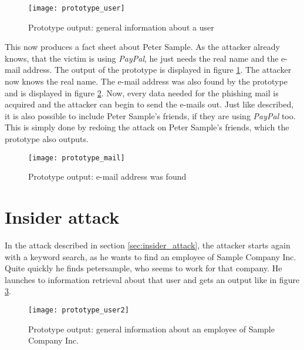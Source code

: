 \begin{figure}[htb]
  \begin{center}
    \texttt{[image: prototype\_user]}
    \caption{Prototype output: general information about a user}
    \label{fig:prototype_user}
  \end{center}
\end{figure}

This now produces a fact sheet about Peter Sample. As the attacker already
knows, that the victim is using \textit{PayPal}, he just needs the real name
and the e-mail address. The output of the prototype is displayed in figure
\ref{fig:prototype_user}. The attacker now knows the real name. The e-mail
address was also found by the prototype and is displayed in figure
\ref{fig:prototype_mail}. Now, every data needed for the phishing mail is
acquired and the attacker can begin to send the e-mails out. Just like described,
it is also possible to include Peter Sample's friends, if they are using
\textit{PayPal} too. This is simply done by redoing the attack on Peter
Sample's friends, which the prototype also outputs.

\begin{figure}[htb]
  \begin{center}
    \texttt{[image: prototype\_mail]}
    \caption{Prototype output: e-mail address was found}
    \label{fig:prototype_mail}
  \end{center}
\end{figure}

\section{Insider attack}

In the attack described in section \ref{sec:insider_attack},
the attacker starts again with a keyword search, as he wants to find an
employee of Sample Company Inc. Quite quickly he finds petersample, who seems to work
for that company. He launches to information retrieval about that user and gets
an output like in figure \ref{fig:prototype_user2}.

\begin{figure}[htb]
  \begin{center}
    \texttt{[image: prototype\_user2]}
    \caption{Prototype output: general information about an employee of Sample
    Company Inc.}
    \label{fig:prototype_user2}
  \end{center}
\end{figure}

